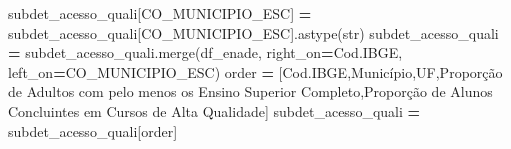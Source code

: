 \documentclass[
  12,
  dvipsnames]{article}
\newenvironment{Shaded}{\begin{snugshade}}{\end{snugshade}}
\newcommand{\BuiltInTok}[1]{#1}
\newcommand{\NormalTok}[1]{#1}
\newcommand{\OperatorTok}[1]{\textcolor[rgb]{0.81,0.36,0.00}{\textbf{#1}}}
\newcommand{\StringTok}[1]{\textcolor[rgb]{0.31,0.60,0.02}{#1}}
\begin{document}
\begin{Shaded}
\begin{Highlighting}[]
\NormalTok{subdet\_acesso\_quali[}\StringTok{\textquotesingle{}CO\_MUNICIPIO\_ESC\textquotesingle{}}\NormalTok{] }\OperatorTok{=}\NormalTok{ subdet\_acesso\_quali[}\StringTok{\textquotesingle{}CO\_MUNICIPIO\_ESC\textquotesingle{}}\NormalTok{].astype(}\BuiltInTok{str}\NormalTok{)}
\NormalTok{subdet\_acesso\_quali }\OperatorTok{=}\NormalTok{ subdet\_acesso\_quali.merge(df\_enade, right\_on}\OperatorTok{=}\StringTok{\textquotesingle{}Cod.IBGE\textquotesingle{}}\NormalTok{,}
\NormalTok{                                                left\_on}\OperatorTok{=}\StringTok{\textquotesingle{}CO\_MUNICIPIO\_ESC\textquotesingle{}}\NormalTok{)}
\NormalTok{order }\OperatorTok{=}\NormalTok{ [}\StringTok{\textquotesingle{}Cod.IBGE\textquotesingle{}}\NormalTok{,}\StringTok{\textquotesingle{}Município\textquotesingle{}}\NormalTok{,}\StringTok{\textquotesingle{}UF\textquotesingle{}}\NormalTok{,}\StringTok{\textquotesingle{}Proporção de Adultos com pelo menos os Ensino Superior Completo\textquotesingle{}}\NormalTok{,}\StringTok{\textquotesingle{}Proporção de Alunos Concluintes em Cursos de Alta Qualidade\textquotesingle{}}\NormalTok{]}
\NormalTok{subdet\_acesso\_quali }\OperatorTok{=}\NormalTok{ subdet\_acesso\_quali[order]}


\end{Highlighting}
\end{Shaded}
\end{document}
